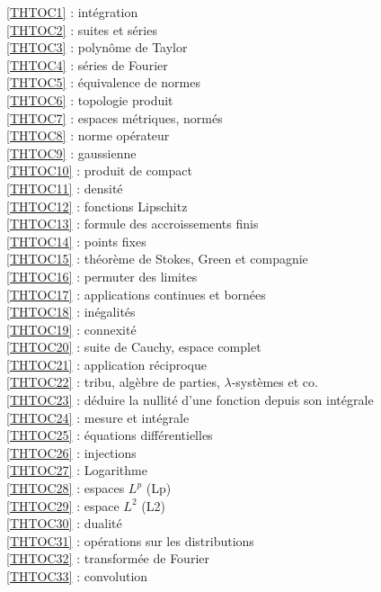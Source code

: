 \ref {THTOC1} : intégration\\
\ref {THTOC2} : suites et séries\\
\ref {THTOC3} : polynôme de Taylor\\
\ref {THTOC4} : séries de Fourier\\
\ref {THTOC5} : équivalence de normes\\
\ref {THTOC6} : topologie produit\\
\ref {THTOC7} : espaces métriques, normés\\
\ref {THTOC8} : norme opérateur\\
\ref {THTOC9} : gaussienne\\
\ref {THTOC10} : produit de compact\\
\ref {THTOC11} : densité\\
\ref {THTOC12} : fonctions Lipschitz\\
\ref {THTOC13} : formule des accroissements finis\\
\ref {THTOC14} : points fixes\\
\ref {THTOC15} : théorème de Stokes, Green et compagnie\\
\ref {THTOC16} : permuter des limites\\
\ref {THTOC17} : applications continues et bornées\\
\ref {THTOC18} : inégalités\\
\ref {THTOC19} : connexité\\
\ref {THTOC20} : suite de Cauchy, espace complet\\
\ref {THTOC21} : application réciproque\\
\ref {THTOC22} : tribu, algèbre de parties, \( \lambda \)-systèmes et co.\\
\ref {THTOC23} : déduire la nullité d'une fonction depuis son intégrale\\
\ref {THTOC24} : mesure et intégrale\\
\ref {THTOC25} : équations différentielles\\
\ref {THTOC26} : injections\\
\ref {THTOC27} : Logarithme\\
\ref {THTOC28} : espaces \( L^p\) (Lp)\\
\ref {THTOC29} : espace \( L^2\) (L2)\\
\ref {THTOC30} : dualité\\
\ref {THTOC31} : opérations sur les distributions\\
\ref {THTOC32} : transformée de Fourier\\
\ref {THTOC33} : convolution\\

